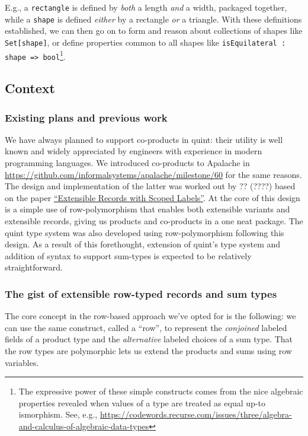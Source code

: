 \documentclass[11pt]{article}
\begin{document}
E.g., a \texttt{rectangle} is defined by \emph{both} a length \emph{and} a width,
packaged together, while a \texttt{shape} is defined \emph{either} by a rectangle
\emph{or} a triangle. With these definitions established, we can then go on
to form and reason about collections of shapes like \texttt{Set[shape]}, or
define properties common to all shapes like
\texttt{isEquilateral : shape => bool}\footnote{The expressive power of these simple constructs comes from the
nice algebraic properties revealed when values of a type are
treated as equal up-to ismorphism. See, e.g.,
\url{https://codewords.recurse.com/issues/three/algebra-and-calculus-of-algebraic-data-types}}.

\subsection{Context}
\label{sec:org64d6776}
\subsubsection{Existing plans and previous work}
\label{sec:org9c97e45}
We have always planned to support co-products in quint: their utility is well
known and widely appreciated by engineers with experience in modern programming
languages. We introduced co-products to Apalache in
\url{https://github.com/informalsystems/apalache/milestone/60} for the same reasons.
The design and implementation of the latter was worked out by ?? (????)
based on the paper \href{https://www.microsoft.com/en-us/research/publication/extensible-records-with-scoped-labels/}{``Extensible Records with Scoped Labels''}. At the core of this
design is a simple use of row-polymorphism that enables both extensible variants
and extensible records, giving us products and co-products in a one neat
package. The quint type system was also developed using row-polymorphism
following this design. As a result of this forethought, extension of quint's
type system and addition of syntax to support sum-types is expected to be
relatively straightforward.

\subsubsection{The gist of extensible row-typed records and sum types}
\label{sec:orga6c4138}
The core concept in the row-based approach we've opted for is the
following: we can use the same construct, called a ``row'', to represent
the \emph{conjoined} labeled fields of a product type and the \emph{alternative}
labeled choices of a sum type. That the row types are polymorphic lets
us extend the products and sums using row variables.
\end{document}
